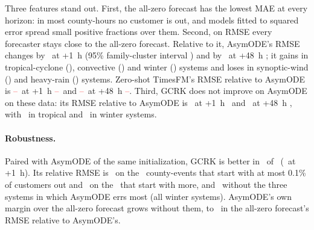 \documentclass[10pt,twocolumn,letterpaper]{article}
\newcommand{\pending}[1]{\textcolor{red}{#1}}
\providecommand{\TimesFMVsHostOne}{\pending{--}}\providecommand{\TimesFMVsHostOneCI}{\pending{--}}
\providecommand{\TimesFMVsHostFortyEight}{\pending{--}}\providecommand{\TimesFMVsHostFortyEightCI}{\pending{--}}
\begin{document}
Three features stand out. First, the all-zero forecast has the lowest MAE at every horizon: in most county-hours no
customer is out, and models fitted to squared error spread small positive fractions over them. Second, on RMSE every
forecaster stays close to the all-zero forecast. Relative to it, AsymODE's RMSE changes by \HostVsZeroOne\ at +1~h
(95\% family-cluster interval \HostVsZeroOneCI) and by \HostVsZeroFortyEight\ at +48~h \HostVsZeroFortyEightCI; it
gains in tropical-cyclone (\HostVsZeroTropical), convective (\HostVsZeroConvective) and winter (\HostVsZeroWinter)
systems and loses in synoptic-wind (\HostVsZeroSynoptic) and heavy-rain (\HostVsZeroRain) systems. Zero-shot TimesFM's
RMSE relative to AsymODE is \TimesFMVsHostOne\ at +1~h \TimesFMVsHostOneCI\ and \TimesFMVsHostFortyEight\ at +48~h
\TimesFMVsHostFortyEightCI. Third, GCRK does not improve on AsymODE on these data: its RMSE relative to AsymODE is
\GCRKVsHostOne\ at +1~h \GCRKVsHostOneCI\ and \GCRKVsHostFortyEight\ at +48~h \GCRKVsHostFortyEightCI, with
\GCRKVsHostTropical\ in tropical and \GCRKVsHostWinter\ in winter systems.

\paragraph{Robustness.} Paired with AsymODE of the same initialization, GCRK is better in \GCRKSeedsBetter\ of
\SeedsGCRK\ (\GCRKSeedRange\ at +1~h). Its relative RMSE is \GCRKVsHostServed\ on the \NServed\ county-events
that start with at most 0.1\% of customers out and \GCRKVsHostStock\ on the \NStock\ that start with more, and
\GCRKVsHostDropThree\ without the three systems in which AsymODE errs most (all winter systems). AsymODE's own margin
over the all-zero forecast grows without them, to \ZeroVsHostDropThree\ in the all-zero forecast's RMSE relative to
AsymODE's.
\end{document}
